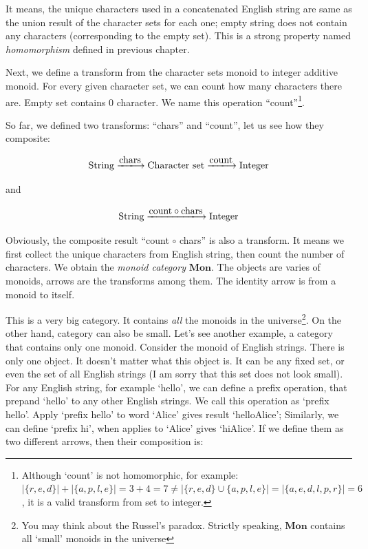 \documentclass[b5paper]{article}
\begin{document}
It means, the unique characters used in a concatenated English string are same as the union result of the character sets for each one; empty string does not contain any characters (corresponding to the empty set). This is a strong property named {\em homomorphism} defined in previous chapter.

Next, we define a transform from the character sets monoid to integer additive monoid. For every given character set, we can count how many characters there are. Empty set contains 0 character. We name this operation ``count''\footnote{Although `count' is not homomorphic, for example: $|\{r, e, d\}| + |\{a, p, l, e\}| = 3 + 4 = 7 \neq |\{r, e, d\} \cup \{a, p, l, e\}| = |\{a, e, d, l, p, r\}| = 6$, it is a valid transform from set to integer.}.

So far, we defined two transforms: ``chars'' and ``count'', let us see how they composite:

\[
\text{String} \arrowto{\text{chars}} \text{Character set} \arrowto{\text{count}} \text{Integer}
\]

and

\[
\text{String} \arrowto{\text{count} \circ \text{chars}} \text{Integer}
\]

Obviously, the composite result ``count $\circ$ chars'' is also a transform. It means we first collect the unique characters from English string, then count the number of characters. We obtain the {\em monoid category} $\pmb{Mon}$. The objects are varies of monoids, arrows are the transforms among them. The identity arrow is from a monoid to itself.

This is a very big category. It contains {\em all} the monoids in the universe\footnote{You may think about the Russel's paradox. Strictly speaking, $\pmb{Mon}$ contains all `small' monoids in the universe}. On the other hand, category can also be small. Let's see another example, a category that contains only one monoid. Consider the monoid of English strings. There is only one object. It doesn't matter what this object is. It can be any fixed set, or even the set of all English strings (I am sorry that this set does not look small). For any English string, for example `hello', we can define a prefix operation, that prepand `hello' to any other English strings. We call this operation as `prefix hello'. Apply `prefix hello' to word `Alice' gives result `helloAlice'; Similarly, we can define `prefix hi', when applies to `Alice' gives `hiAlice'. If we define them as two different arrows, then their composition is:
\end{document}
